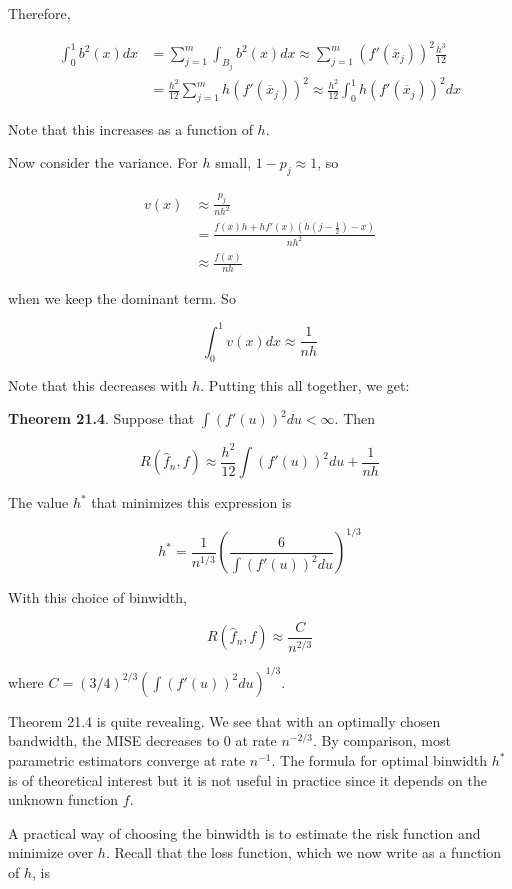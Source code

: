 Therefore,

\[
\begin{align}
\int_0^1 b^2(x) dx &= \sum_{j=1}^m \int_{B_j} b^2(x) dx \approx \sum_{j=1}^m (f'(\overline{x}_j))^2 \frac{h^3}{12} \\
&= \frac{h^2}{12} \sum_{j=1}^m h(f'(\overline{x}_j))^2 \approx \frac{h^2}{12} \int_0^1 h(f'(\overline{x}_j))^2 dx
\end{align}
\]

Note that this increases as a function of \(h\).

Now consider the variance. For \(h\) small, \(1 - p_j \approx 1\), so

\[
\begin{align}
v(x) &\approx \frac{p_j}{nh^2}\\
&= \frac{f(x)h + h f'(x)\left(h \left(j - \frac{1}{2} \right) - x \right)}{nh^2} \\
&\approx \frac{f(x)}{nh}
\end{align}
\]

when we keep the dominant term. So

\[
\int_0^1 v(x) dx \approx \frac{1}{nh}
\]

Note that this decreases with \(h\). Putting this all together, we get:

\textbf{Theorem 21.4}. Suppose that \(\int (f'(u))^2 du < \infty\). Then

\[ R(\hat{f}_n, f) \approx \frac{h^2}{12} \int (f'(u))^2 du + \frac{1}{nh}\]

The value \(h^*\) that minimizes this expression is

\[ h^* = \frac{1}{n^{1/3}} \left( \frac{6}{\int (f'(u))^2 du} \right)^{1/3}\]

With this choice of binwidth,

\[ R(\hat{f}_n, f) \approx \frac{C}{n^{2/3}} \]

where \(C = (3/4)^{2/3} \left( \int (f'(u))^2 du \right)^{1/3}\).

Theorem 21.4 is quite revealing. We see that with an optimally chosen
bandwidth, the MISE decreases to 0 at rate \(n^{-2/3}\). By comparison,
most parametric estimators converge at rate \(n^{-1}\). The formula for
optimal binwidth \(h^*\) is of theoretical interest but it is not useful
in practice since it depends on the unknown function \(f\).

A practical way of choosing the binwidth is to estimate the risk
function and minimize over \(h\). Recall that the loss function, which
we now write as a function of \(h\), is

